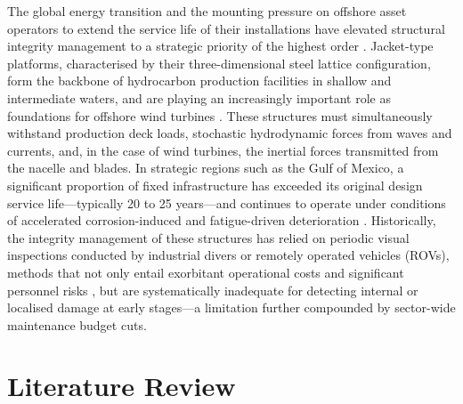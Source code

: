 \documentclass[a4paper,fleqn,nologo]{cas-dc}
\begin{document}
The global energy transition and the mounting pressure on offshore asset operators to extend the service life of their installations have elevated structural integrity management to a strategic priority of the highest order \citep{hlaing2024lifecycle}. Jacket-type platforms, characterised by their three-dimensional steel lattice configuration, form the backbone of hydrocarbon production facilities in shallow and intermediate waters, and are playing an increasingly important role as foundations for offshore wind turbines \citep{mdpi2024shm_wind}. These structures must simultaneously withstand production deck loads, stochastic hydrodynamic forces from waves and currents, and, in the case of wind turbines, the inertial forces transmitted from the nacelle and blades. In strategic regions such as the Gulf of Mexico, a significant proportion of fixed infrastructure has exceeded its original design service life---typically 20 to 25 years---and continues to operate under conditions of accelerated corrosion-induced and fatigue-driven deterioration \citep{mubarak2020condition}. Historically, the integrity management of these structures has relied on periodic visual inspections conducted by industrial divers or remotely operated vehicles (ROVs), methods that not only entail exorbitant operational costs and significant personnel risks \citep{instituto2020tech}, but are systematically inadequate for detecting internal or localised damage at early stages---a limitation further compounded by sector-wide maintenance budget cuts.

\section{Literature Review}
\end{document}
